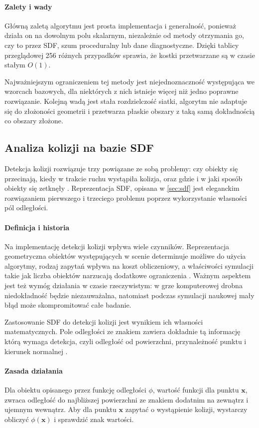 \paragraph{Zalety i wady}
Główną zaletą algorytmu jest prosta implementacja i generalność, ponieważ działa on na dowolnym polu skalarnym, niezależnie od metody otrzymania go, czy to przez SDF, szum proceduralny lub dane diagnostyczne. Dzięki tablicy przeglądowej 256 różnych przypadków sprawia, że kostki przetwarzane są w czasie stałym $O(1)$.

Najważniejszym ograniczeniem tej metody jest niejednoznaczność występująca we wzorcach bazowych, dla niektórych z nich istnieje więcej niż jedno poprawne rozwiązanie. Kolejną wadą jest stała rozdzielczość siatki, algorytm nie adaptuje się do złożoności geometrii i przetwarza płaskie obszary z taką samą dokładnością co obszary złożone.

\subsection{Analiza kolizji na bazie SDF}
\label{sec:kol}
Detekcja kolizji rozwiązuje trzy powiązane ze sobą problemy: czy obiekty się przecinają, kiedy w trakcie ruchu wystąpiła kolizja, oraz gdzie i w jaki sposób obiekty się zetknęły \cite{ericson2004}. Reprezentacja SDF, opisana w \ref{sec:sdf} jest eleganckim rozwiązaniem pierwszego i trzeciego problemu poprzez wykorzystanie własności pól odległości.

\paragraph{Definicja i historia}
Na implementację detekcji kolizji wpływa wiele czynników. Reprezentacja geometryczna obiektów występujących w scenie determinuje możliwe do użycia algorytmy, rodzaj zapytań wpływa na koszt obliczeniowy, a właściwości symulacji takie jak liczba obiektów narzucają dodatkowe ograniczenia \cite{ericson2004}. Ważnym aspektem jest też wymóg działania w czasie rzeczywistym: w grze komputerowej drobna niedokładność będzie niezauważalna, natomiast podczas symulacji naukowej mały błąd może skompromitować całe badanie.

Zastosowanie SDF do detekcji kolizji jest wynikiem ich własności matematycznych. Pole odległości ze znakiem zawiera dokładnie tą informację którą wymaga detekcja, czyli odległość od powierzchni, przynależność punktu i kierunek normalnej \cite{bridson2008}.

\paragraph{Zasada działania}
Dla obiektu opisanego przez funkcję odległości $\phi$, wartość funkcji dla punktu $\mathbf{x}$, zwraca odległość do najbliższej powierzchni ze znakiem dodatnim na zewnątrz i ujemnym wewnątrz. Aby dla punktu $\mathbf{x}$ zapytać o wystąpienie kolizji, wystarczy obliczyć $\phi(\mathbf{x})$ i sprawdzić znak wartości. 

